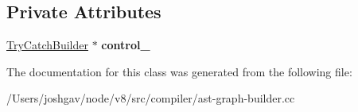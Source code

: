 \subsection*{Private Attributes}
\begin{DoxyCompactItemize}
\item 
\hyperlink{classv8_1_1internal_1_1compiler_1_1_try_catch_builder}{Try\+Catch\+Builder} $\ast$ {\bfseries control\+\_\+}\hypertarget{classv8_1_1internal_1_1compiler_1_1_ast_graph_builder_1_1_control_scope_for_catch_a1293a4f1514d220f21c5f1ac384d57aa}{}\label{classv8_1_1internal_1_1compiler_1_1_ast_graph_builder_1_1_control_scope_for_catch_a1293a4f1514d220f21c5f1ac384d57aa}

\end{DoxyCompactItemize}


The documentation for this class was generated from the following file\+:\begin{DoxyCompactItemize}
\item 
/\+Users/joshgav/node/v8/src/compiler/ast-\/graph-\/builder.\+cc\end{DoxyCompactItemize}
